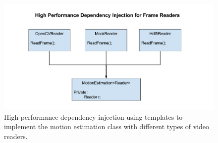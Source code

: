 \begin{figure}[h]
  \label{fig:hiperf_dependency}
  \centering
  \includegraphics[width=\textwidth]{figures/dependency_injection}
  \caption{High performance dependency injection using templates to implement the
  motion estimation class with different types of video readers.}
\end{figure}
